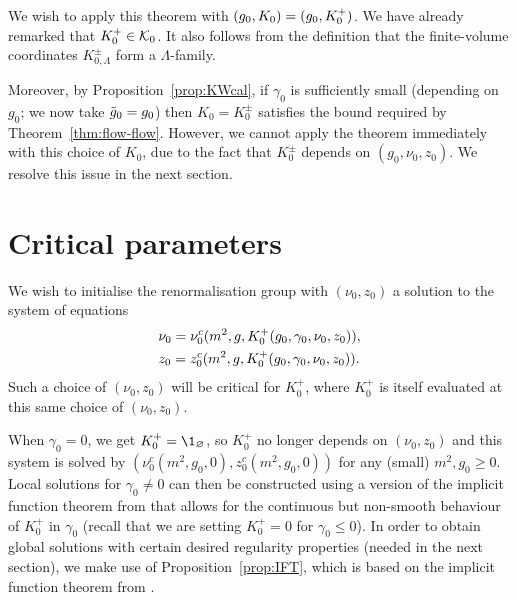 We wish to apply this theorem with $(g_0, K_0) = (g_0, K^+_0)$.
We have already remarked that $K^+_0 \in \mathcal{K}_0$.
It also follows from the definition that
the finite-volume coordinates $K^\pm_{0,\Lambda}$ form a $\Lambda$-family.

Moreover,
by Proposition~\ref{prop:KWcal}, if
$\gamma_0$ is sufficiently small (depending on $g_0$; we now take $\tilde{g}_0=g_0$)
then $K_0 = K^\pm_0$ satisfies the bound required by Theorem~\ref{thm:flow-flow}.
However, we cannot apply the theorem immediately with this choice
of $K_0$,
due to the fact that $K^\pm_0$
depends on $(g_0, \nu_0, z_0)$.
We resolve this issue in the next section.

\section{Critical parameters}
\label{sec:nu0z0c}

We wish to initialise the renormalisation group with $(\nu_0, z_0)$ a solution
to the system of equations
\begin{align}
&\nu_0 = \nu_0^c(m^2, g, K^+_0(g_0, \gamma_0, \nu_0, z_0)), \label{e:mu0c}
\\
&z_0 = z_0^c(m^2, g, K^+_0(g_0, \gamma_0, \nu_0, z_0)) \label{e:z0c}
.
\end{align}
Such a choice of $(\nu_0, z_0)$ will be critical for $K^+_0$,
where $K^+_0$ is itself evaluated at this same choice of $(\nu_0, z_0)$.

When $\gamma_0 = 0$, we get $K^+_0 = \1_\varnothing$, so $K^+_0$ no longer depends on $(\nu_0, z_0)$
and this system is solved by $(\nu_0^c(m^2, g_0, 0), z_0^c(m^2, g_0, 0))$
for any (small) $m^2, g_0 \geq 0$.
Local solutions for $\gamma_0 \neq 0$ can then be
constructed using a version of the implicit function theorem from \cite{LS14}
that allows for the continuous but non-smooth behaviour of $K^+_0$ in $\gamma_0$
(recall that we are setting $K^+_0 = 0$ for $\gamma_0 \le 0$).
In order to obtain global solutions with certain desired regularity properties
(needed in the next section), we make use of Proposition~\ref{prop:IFT},
which is based on the implicit function theorem from \cite{LS14}.


